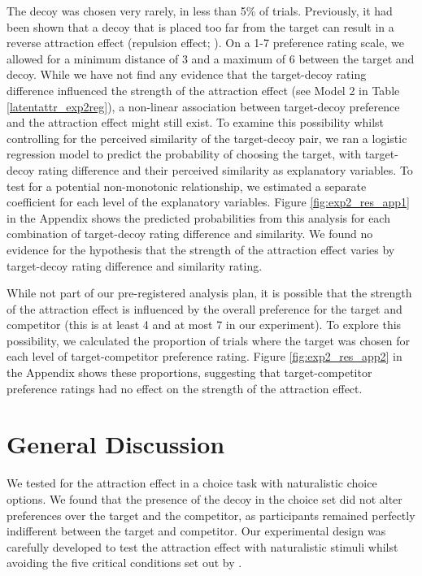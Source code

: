 \documentclass[12pt, a4paper]{article}
\begin{document}
The decoy was chosen very rarely, in less than 5\% of trials. Previously, it had been shown that a decoy that is placed too far from the target can result in a reverse attraction effect (repulsion effect; ). On a 1-7 preference rating scale, we allowed for a minimum distance of 3 and a maximum of 6 between the target and decoy. While we have not find any evidence that the target-decoy rating difference influenced the strength of the attraction effect (see Model 2 in Table \ref{latentattr_exp2reg}), a non-linear association between target-decoy preference and the attraction effect might still exist. To examine this possibility whilst controlling for the perceived similarity of the target-decoy pair, we ran a logistic regression model to predict the probability of choosing the target, with target-decoy rating difference and their perceived similarity as explanatory variables. To test for a potential non-monotonic relationship, we estimated a separate coefficient for each level of the explanatory variables. Figure \ref{fig:exp2_res_app1}  in the Appendix shows the predicted probabilities from this analysis for each combination of target-decoy rating difference and similarity. We found no evidence for the hypothesis that the strength of the attraction effect varies by target-decoy rating difference and similarity rating.

While not part of our pre-registered analysis plan, it is possible that the strength of the attraction effect is influenced by the overall preference for the target and competitor (this is at least 4 and at most 7 in our experiment). To explore this possibility, we calculated the proportion of trials where the target was chosen for each level of target-competitor preference rating. Figure \ref{fig:exp2_res_app2} in the Appendix shows these proportions, suggesting that target-competitor preference ratings had no effect on the strength of the attraction effect. 


\section*{General Discussion}

We tested for the attraction effect in a choice task with naturalistic choice options. We found that the presence of the decoy in the choice set did not alter preferences over the target and the competitor, as participants remained perfectly indifferent between the target and competitor. Our experimental design was carefully developed to test the attraction effect with naturalistic stimuli whilst avoiding the five critical conditions set out by .
\end{document}
